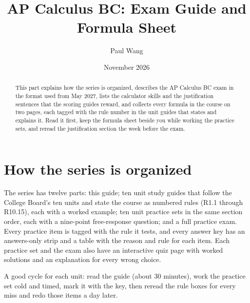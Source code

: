\documentclass{apcalc}
\title{AP Calculus BC: Exam Guide and Formula Sheet}
\author{Paul Wang}
\date{November 2026}
\begin{document}
\maketitle

\begin{abstract}
This part explains how the series is organized, describes the AP Calculus BC exam in the format used from May 2027, lists the calculator skills and the justification sentences that the scoring guides reward, and collects every formula in the course on two pages, each tagged with the rule number in the unit guides that states and explains it. Read it first, keep the formula sheet beside you while working the practice sets, and reread the justification section the week before the exam.
\end{abstract}

\section{How the series is organized}
The series has twelve parts: this guide; ten unit study guides that follow the College Board's ten units and state the course as numbered rules (R1.1 through R10.15), each with a worked example; ten unit practice sets in the same section order, each with a nine-point free-response question; and a full practice exam. Every practice item is tagged with the rule it tests, and every answer key has an answers-only strip and a table with the reason and rule for each item. Each practice set and the exam also have an interactive quiz page with worked solutions and an explanation for every wrong choice.

A good cycle for each unit: read the guide (about 30 minutes), work the practice set cold and timed, mark it with the key, then reread the rule boxes for every miss and redo those items a day later.
\end{document}
